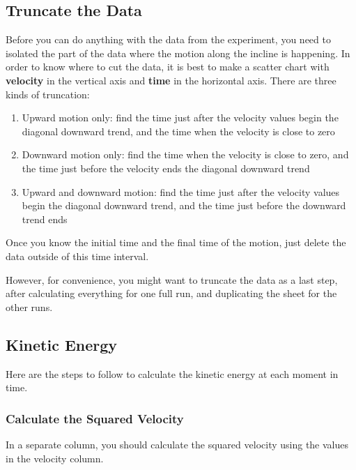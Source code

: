 \subsection{Truncate the Data}
Before you can do anything with the data from the experiment, you need to isolated the part of the data where the motion along the incline is happening. In order to know where to cut the data, it is best to make a scatter chart with \textbf{velocity} in the vertical axis and \textbf{time} in the horizontal axis. There are three kinds of truncation:
\begin{enumerate}
    \item Upward motion only: find the time just after the velocity values begin the diagonal downward trend, and the time when the velocity is close to zero
    \item Downward motion only: find the time when the velocity is close to zero, and the time just before the velocity ends the diagonal downward trend
    \item Upward and downward motion: find the time just after the velocity values begin the diagonal downward trend, and the time just before the downward trend ends
\end{enumerate}
Once you know the initial time and the final time of the motion, just delete the data outside of this time interval.

However, for convenience, you might want to truncate the data as a last step, after calculating everything for one full run, and duplicating the sheet for the other runs.
\subsection{Kinetic Energy}
Here are the steps to follow to calculate the kinetic energy at each moment in time.
\subsubsection{Calculate the Squared Velocity}
In a separate column, you should calculate the squared velocity using the values in the velocity column.

